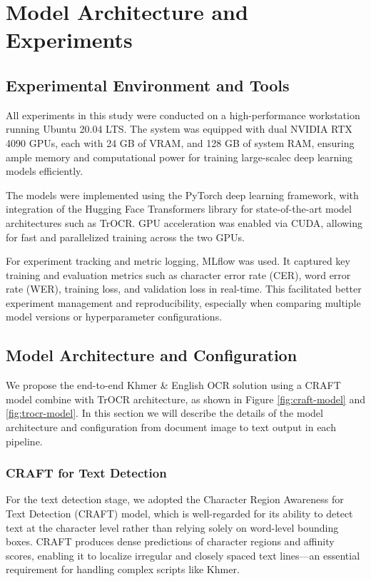 \chapter{Model Architecture and Experiments}
\label{ch:experiments}

\section{Experimental Environment and Tools}
\label{sec:environment}
All experiments in this study were conducted on a high-performance workstation running 
Ubuntu 20.04 LTS. The system was equipped with dual NVIDIA RTX 4090 GPUs, each with 
24 GB of VRAM, and 128 GB of system RAM, ensuring ample memory and computational power 
for training large-scalec deep learning models efficiently.

The models were implemented using the PyTorch deep learning framework, with integration of the Hugging Face Transformers library for state-of-the-art model architectures such as TrOCR. GPU acceleration was enabled via CUDA, allowing for fast and parallelized training across the two GPUs.

For experiment tracking and metric logging, MLflow was used. It captured key training 
and evaluation metrics such as character error rate (CER), word error rate (WER), 
training loss, and validation loss in real-time. This facilitated better experiment 
management and reproducibility, especially when comparing multiple model versions or 
hyperparameter configurations.



\section{Model Architecture and Configuration}
\label{sec:architecture}
We propose the end-to-end Khmer \& English OCR solution using a CRAFT model combine
with TrOCR architecture, as shown in Figure \ref{fig:craft-model} and \ref{fig:trocr-model}.
In this section we will describe the details of the model architecture and configuration
from document image to text output in each pipeline.

\subsection{CRAFT for Text Detection}
\label{subsec:craft}

For the text detection stage, we adopted the Character Region Awareness for Text 
Detection (CRAFT) model, which is well-regarded for its ability to detect text at 
the character level rather than relying solely on word-level bounding boxes. 
CRAFT produces dense predictions of character regions and affinity scores, 
enabling it to localize irregular and closely spaced text lines—an essential 
requirement for handling complex scripts like Khmer.

